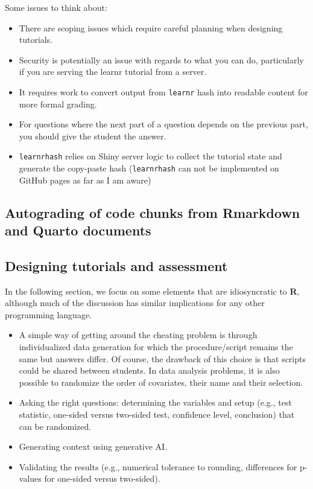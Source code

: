 \documentclass[
  letterpaper,
  DIV=11,
  numbers=noendperiod]{scrartcl}
\providecommand{\tightlist}{%
  \setlength{\itemsep}{0pt}\setlength{\parskip}{0pt}}
\begin{document}
Some issues to think about:

\begin{itemize}
\tightlist
\item
  There are scoping issues which require careful planning when designing
  tutorials.
\item
  Security is potentially an issue with regards to what you can do,
  particularly if you are serving the learnr tutorial from a server.
\item
  It requires work to convert output from \texttt{learnr} hash into
  readable content for more formal grading.
\item
  For questions where the next part of a question depends on the
  previous part, you should give the student the answer.
\item
  \texttt{learnrhash} relies on Shiny server logic to collect the
  tutorial state and generate the copy-paste hash (\texttt{learnrhash}
  can not be implemented on GitHub pages as far as I am aware)
\end{itemize}

\subsection{Autograding of code chunks from Rmarkdown and Quarto
documents}\label{autograding-of-code-chunks-from-rmarkdown-and-quarto-documents}

\subsection{Designing tutorials and
assessment}\label{designing-tutorials-and-assessment}

In the following section, we focus on some elements that are
idiosyncratic to \textbf{R}, although much of the discussion has similar
implications for any other programming language.

\begin{itemize}
\tightlist
\item
  A simple way of getting around the cheating problem is through
  individualized data generation for which the procedure/script remains
  the same but answers differ. Of course, the drawback of this choice is
  that scripts could be shared between students. In data analysis
  problems, it is also possible to randomize the order of covariates,
  their name and their selection.
\item
  Asking the right questions: determining the variables and setup (e.g.,
  test statistic, one-sided versus two-sided test, confidence level,
  conclusion) that can be randomized.
\item
  Generating context using generative AI.
\item
  Validating the results (e.g., numerical tolerance to rounding,
  differences for p-values for one-sided versus two-sided).
\end{itemize}
\end{document}
